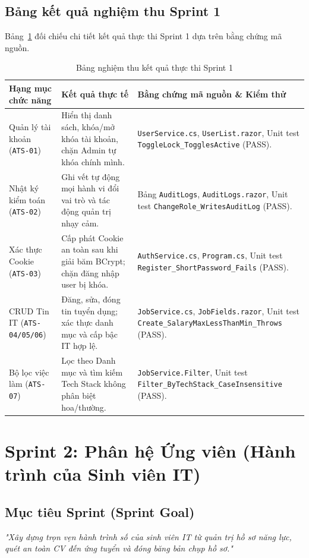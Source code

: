 \subsection{Bảng kết quả nghiệm thu Sprint 1}
Bảng~\ref{tab:sprint1-results} đối chiếu chi tiết kết quả thực thi Sprint 1 dựa trên bằng chứng mã nguồn.

\begin{table}[htbp]
\centering
\small
\caption{Bảng nghiệm thu kết quả thực thi Sprint 1}
\label{tab:sprint1-results}
\begin{tabularx}{\textwidth}{p{3.2cm} p{3.8cm} X}
\toprule
\textbf{Hạng mục chức năng} & \textbf{Kết quả thực tế} & \textbf{Bằng chứng mã nguồn \& Kiểm thử} \\
\midrule
Quản lý tài khoản (\texttt{ATS-01}) & Hiển thị danh sách, khóa/mở khóa tài khoản, chặn Admin tự khóa chính mình. & \texttt{UserService.cs}, \texttt{UserList.razor}, Unit test \texttt{ToggleLock\_TogglesActive} (PASS). \\
\addlinespace
Nhật ký kiểm toán (\texttt{ATS-02}) & Ghi vết tự động mọi hành vi đổi vai trò và tác động quản trị nhạy cảm. & Bảng \texttt{AuditLogs}, \texttt{AuditLogs.razor}, Unit test \texttt{ChangeRole\_WritesAuditLog} (PASS). \\
\addlinespace
Xác thực Cookie (\texttt{ATS-03}) & Cấp phát Cookie an toàn sau khi giải băm BCrypt; chặn đăng nhập user bị khóa. & \texttt{AuthService.cs}, \texttt{Program.cs}, Unit test \texttt{Register\_ShortPassword\_Fails} (PASS). \\
\addlinespace
CRUD Tin IT (\texttt{ATS-04/05/06}) & Đăng, sửa, đóng tin tuyển dụng; xác thực danh mục và cấp bậc IT hợp lệ. & \texttt{JobService.cs}, \texttt{JobFields.razor}, Unit test \texttt{Create\_SalaryMaxLessThanMin\_Throws} (PASS). \\
\addlinespace
Bộ lọc việc làm (\texttt{ATS-07}) & Lọc theo Danh mục và tìm kiếm Tech Stack không phân biệt hoa/thường. & \texttt{JobService.Filter}, Unit test \texttt{Filter\_ByTechStack\_CaseInsensitive} (PASS). \\
\bottomrule
\end{tabularx}
\end{table}

\section{Sprint 2: Phân hệ Ứng viên (Hành trình của Sinh viên IT)}
\label{sec:sprint-2}

\subsection{Mục tiêu Sprint (Sprint Goal)}
\textit{"Xây dựng trọn vẹn hành trình số của sinh viên IT từ quản trị hồ sơ năng lực, quét an toàn CV đến ứng tuyển và đóng băng bản chụp hồ sơ."}

